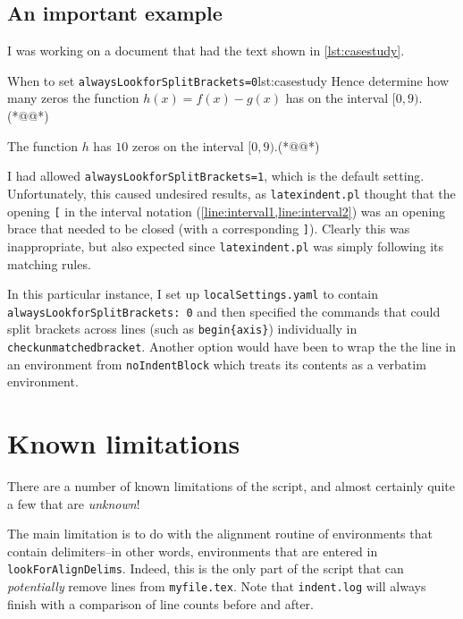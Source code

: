 \documentclass[11pt]{article}
\begin{document}
\subsection{An important example}
I was working on a document that had the text shown in \cref{lst:casestudy}.
\begin{cmhlistings}[style=demo,escapeinside={(*@}{@*)}]{When to set \lstinline!alwaysLookforSplitBrackets=0!}{lst:casestudy}
Hence determine how many zeros the function $h(x)=f(x)-g(x)$
has on the interval $[0,9)$.(*@\label{line:interval1}@*)
\begin{shortsolution}
	The function $h$ has $10$ zeros on the interval $[0,9)$.(*@\label{line:interval2}@*)
\end{shortsolution}
\end{cmhlistings}
I had allowed \lstinline!alwaysLookforSplitBrackets=1!, which is the default setting.
Unfortunately, this caused undesired results, as \lstinline!latexindent.pl! thought that the opening
\lstinline![!  in the interval notation (\cref{line:interval1,line:interval2})
was an opening brace that needed to be closed (with a corresponding \lstinline!]!). Clearly
this was inappropriate, but also expected since \lstinline!latexindent.pl! was simply
following its matching rules.

In this particular instance, I set up \lstinline!localSettings.yaml!
to contain \lstinline!alwaysLookforSplitBrackets: 0! and then specified the commands
that could split brackets across lines (such as \lstinline!begin{axis}!) individually
in \lstinline!checkunmatchedbracket!.  Another option would have been to wrap the
the line in an environment from \lstinline!noIndentBlock! which treats its contents
as a verbatim environment.


\section{Known limitations}\label{sec:knownlimitations}
There are a number of known limitations of the script, and almost certainly quite a
few that are \emph{unknown}!

The main limitation is to do with the alignment routine of environments that contain
delimiters--in other words, environments that are entered in \lstinline!lookForAlignDelims!.
Indeed, this is the only part of the script that can \emph{potentially} remove
lines from \lstinline!myfile.tex!. Note that \lstinline!indent.log! will always
finish with a comparison of line counts before and after.
\end{document}
